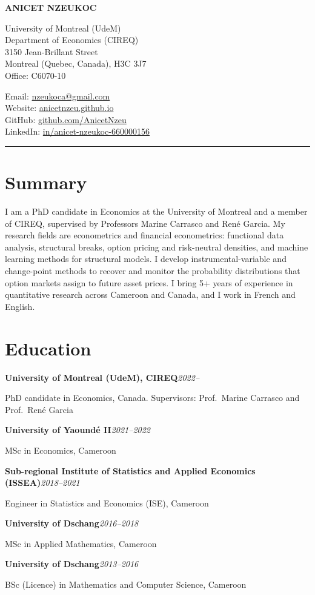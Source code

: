 \documentclass[11pt,letterpaper]{article}
\newenvironment{block}{\begin{list}{}{\setlength{\leftmargin}{1.6em}\setlength{\topsep}{0pt}%
  \setlength{\partopsep}{0pt}\setlength{\itemsep}{0pt}\setlength{\parsep}{0pt}}\item[]}{\end{list}}
\newcommand{\entry}[2]{\textbf{#1}\hfill\textit{#2}\par}
\newcommand{\gap}{\par\vspace{0.6em}}
\begin{document}
\begin{center}
{\LARGE\bfseries ANICET NZEUKOC}
\end{center}
\vspace{1.4em}

\begin{minipage}[t]{0.52\textwidth}
University of Montreal (UdeM)\\
Department of Economics (CIREQ)\\
3150 Jean-Brillant Street\\
Montreal (Quebec, Canada), H3C 3J7\\
Office: C6070-10
\end{minipage}%
\begin{minipage}[t]{0.48\textwidth}
Email: \href{mailto:nzeukoca@gmail.com}{nzeukoca@gmail.com}\\
Website: \href{https://anicetnzeu.github.io}{anicetnzeu.github.io}\\
GitHub: \href{https://github.com/AnicetNzeu}{github.com/AnicetNzeu}\\
LinkedIn: \href{https://www.linkedin.com/in/anicet-nzeukoc-660000156}{in/anicet-nzeukoc-660000156}
\end{minipage}

\vspace{1.6em}
\rule{0.5\textwidth}{0.4pt}

\section*{Summary}
\begin{block}
I am a PhD candidate in Economics at the University of Montreal and a member of CIREQ, supervised by
Professors Marine Carrasco and René Garcia. My research fields are econometrics and financial
econometrics: functional data analysis, structural breaks, option pricing and risk-neutral densities,
and machine learning methods for structural models. I develop instrumental-variable and change-point
methods to recover and monitor the probability distributions that option markets assign to future asset
prices. I bring 5+ years of experience in quantitative research across Cameroon and Canada, and I work
in French and English.
\end{block}

\section*{Education}
\begin{block}
\entry{University of Montreal (UdeM), CIREQ}{2022--}
PhD candidate in Economics, Canada. Supervisors: Prof.\ Marine Carrasco and Prof.\ René Garcia
\gap
\entry{University of Yaoundé II}{2021--2022}
MSc in Economics, Cameroon
\gap
\entry{Sub-regional Institute of Statistics and Applied Economics (ISSEA)}{2018--2021}
Engineer in Statistics and Economics (ISE), Cameroon
\gap
\entry{University of Dschang}{2016--2018}
MSc in Applied Mathematics, Cameroon
\gap
\entry{University of Dschang}{2013--2016}
BSc (Licence) in Mathematics and Computer Science, Cameroon
\end{block}
\end{document}
